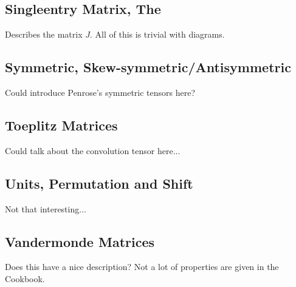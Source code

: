 \subsection{Singleentry Matrix, The}
Describes the matrix $J$.
All of this is trivial with diagrams.
\subsection{Symmetric, Skew-symmetric/Antisymmetric}
\label{sec:symmetric}

Could introduce Penrose's symmetric tensors here?

\subsection{Toeplitz Matrices}
Could talk about the convolution tensor here...
\subsection{Units, Permutation and Shift}
Not that interesting...
\subsection{Vandermonde Matrices}
Does this have a nice description?
Not a lot of properties are given in the Cookbook.


